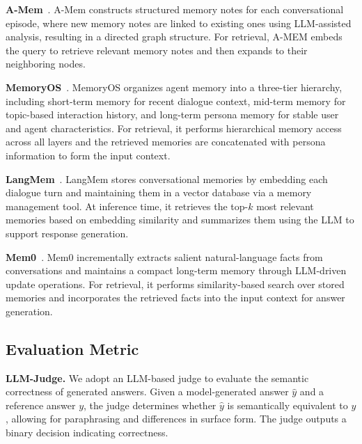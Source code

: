 \documentclass{llmxive}
\begin{document}
\textbf{A-Mem}~\cite{DBLP:journals/corr/abs-2502-12110}.
A-Mem constructs structured memory notes for each conversational episode, where new memory notes are linked to existing ones using LLM-assisted analysis, resulting in a directed graph structure.
For retrieval, A-MEM embeds the query to retrieve relevant memory notes and then expands to their neighboring nodes.


\textbf{MemoryOS}~\cite{DBLP:journals/corr/abs-2506-06326}.
MemoryOS organizes agent memory into a three-tier hierarchy, including short-term memory for recent dialogue context, mid-term memory for topic-based interaction history, and long-term persona memory for stable user and agent characteristics.
For retrieval, it performs hierarchical memory access across all layers and the retrieved memories are concatenated with persona information to form the input context.

\textbf{LangMem}~\cite{langmem2025}.
LangMem stores conversational memories by embedding each dialogue turn and maintaining them in a vector database via a memory management tool.
At inference time, it retrieves the top-$k$ most relevant memories based on embedding similarity and summarizes them using the LLM to support response generation.

\textbf{Mem0}~\cite{DBLP:journals/corr/abs-2504-19413}.
Mem0 incrementally extracts salient natural-language facts from conversations and maintains a compact long-term memory through LLM-driven update operations.
For retrieval, it performs similarity-based search over stored memories and incorporates the retrieved facts into the input context for answer generation.

\subsection{Evaluation Metric}

\textbf{LLM-Judge.}
We adopt an LLM-based judge to evaluate the semantic correctness of generated answers.
Given a model-generated answer $\hat{y}$ and a reference answer $y$, the judge determines whether $\hat{y}$ is semantically equivalent to $y$, allowing for paraphrasing and differences in surface form.
The judge outputs a binary decision indicating correctness.
\end{document}
